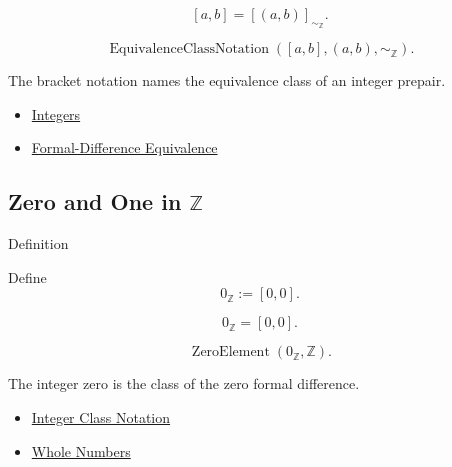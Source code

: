 \begin{remark*}
\[
[a,b]=[(a,b)]_{\sim_{\mathbb{Z}}}.
\]
\end{remark*}

\begin{remark*}
\[
\operatorname{EquivalenceClassNotation}([a,b],(a,b),\sim_{\mathbb{Z}}).
\]
\end{remark*}

\begin{remark*}[Interpretation]
The bracket notation names the equivalence class of an integer prepair.
\end{remark*}

\begin{dependencies}
\begin{itemize}
  \item \hyperref[def:integers]{Integers}
  \item \hyperref[def:formal-difference-equivalence]{Formal-Difference Equivalence}
\end{itemize}
\end{dependencies}

\subsection*{\texorpdfstring{Zero and One in $\mathbb{Z}$}{Zero and One in Z}}

\begin{definitionbox}{Definition}
\begin{definition}
\label{def:zero-in-z}
Define
\[
0_{\mathbb{Z}}:=[0,0].
\]
\end{definition}
\end{definitionbox}

\begin{remark*}
\[
0_{\mathbb{Z}}=[0,0].
\]
\end{remark*}

\begin{remark*}
\[
\operatorname{ZeroElement}(0_{\mathbb{Z}},\mathbb{Z}).
\]
\end{remark*}

\begin{remark*}[Interpretation]
The integer zero is the class of the zero formal difference.
\end{remark*}

\begin{dependencies}
\begin{itemize}
  \item \hyperref[def:integer-class-notation]{Integer Class Notation}
  \item \hyperref[def:whole-numbers]{Whole Numbers}
\end{itemize}
\end{dependencies}

